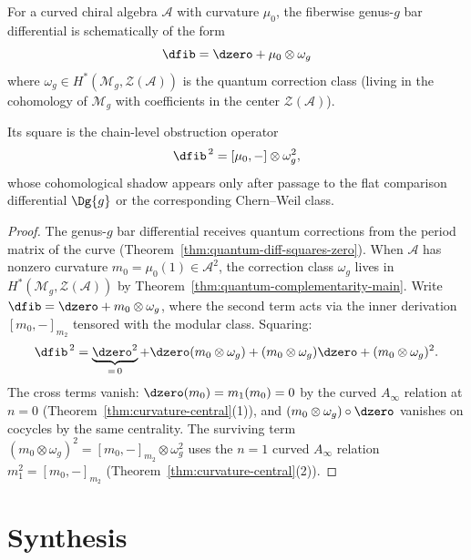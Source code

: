 \begin{corollary}\label{cor:curved-differential}
For a curved chiral algebra $\mathcal{A}$ with curvature $\mu_0$, the fiberwise genus-$g$ bar
differential is schematically of the form
\[\dfib = \dzero + \mu_0 \otimes \omega_g\]
where $\omega_g \in H^*(\mathcal{M}_g, \mathcal{Z}(\mathcal{A}))$ is the quantum correction class (living in the cohomology of $\mathcal{M}_g$ with coefficients in the center $\mathcal{Z}(\mathcal{A})$).

Its square is the chain-level obstruction operator
\[\dfib^{\,2} = [\mu_0, -] \otimes \omega_g^2,\]
whose cohomological shadow appears only after passage to the flat
comparison differential $\Dg{g}$ or the corresponding Chern--Weil
class.
\end{corollary}
\begin{proof}
The genus-$g$ bar differential receives quantum corrections from the
period matrix of the curve
(Theorem~\ref{thm:quantum-diff-squares-zero}). When $\mathcal{A}$ has
nonzero curvature $m_0 = \mu_0(1) \in \mathcal{A}^2$, the correction
class $\omega_g$ lives in
$H^*(\mathcal{M}_g, \mathcal{Z}(\mathcal{A}))$ by
Theorem~\ref{thm:quantum-complementarity-main}. Write
$\dfib = \dzero + m_0 \otimes \omega_g$, where the second term acts
via the inner derivation $[m_0, -]_{m_2}$ tensored with the modular
class. Squaring:
\[
\dfib^{\,2}
= \underbrace{\dzero^2}_{=\,0}
+ \dzero(m_0 \otimes \omega_g)
+ (m_0 \otimes \omega_g)\dzero
+ (m_0 \otimes \omega_g)^2.
\]
The cross terms vanish: $\dzero(m_0) = m_1(m_0) = 0$ by the curved
$A_\infty$ relation at $n = 0$
(Theorem~\ref{thm:curvature-central}(1)), and
$(m_0 \otimes \omega_g) \circ \dzero$ vanishes on cocycles by the
same centrality. The surviving term
$(m_0 \otimes \omega_g)^2 = [m_0, -]_{m_2} \otimes \omega_g^2$
uses the $n = 1$ curved $A_\infty$ relation $m_1^2 = [m_0, -]_{m_2}$
(Theorem~\ref{thm:curvature-central}(2)).
\end{proof}

\section{Synthesis}
\label{sec:cobar-supplement}


